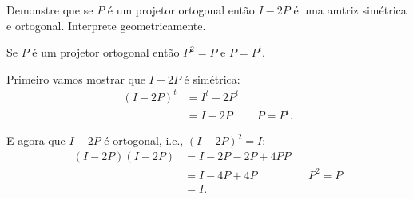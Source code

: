 \begin{questions}
\begin{solution}
\begin{center}
        \end{center}
    \end{solution}

    \question Demonstre que se $P$ \'{e} um projetor ortogonal ent\~{a}o $I - 2P$ \'{e} uma amtriz sim\'{e}trica e ortogonal. Interprete geometricamente.
    \begin{solution}
        Se $P$ \'{e} um projetor ortogonal ent\~{a}o $P^2 = P$ e $P = P^t$.
        
        Primeiro vamos mostrar que $I - 2P$ \'{e} sim\'{e}trica:
        \begin{align*}
            \left( I - 2 P \right)^t &= I^t - 2 P^t \\
            &= I - 2 P && P = P^t .
        \end{align*}

        E agora que $I - 2P$ \'{e} ortogonal, i.e., $\left( I - 2 P \right)^2 = I$:
        \begin{align*}
            \left( I - 2 P \right) \left( I - 2 P \right) &= I - 2 P - 2 P + 4 P P \\
            &= I - 4 P + 4 P && P^2 = P \\
            &= I .
        \end{align*}
    \end{solution}
\end{questions}
